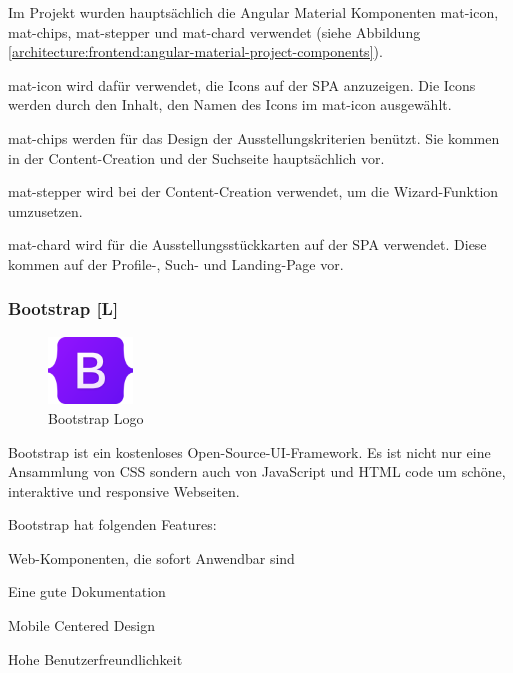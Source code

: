 Im Projekt wurden hauptsächlich die Angular Material Komponenten mat-icon, mat-chips, mat-stepper und mat-chard verwendet (siehe Abbildung \ref{architecture:frontend:angular-material-project-components}).

mat-icon wird dafür verwendet, die Icons auf der SPA anzuzeigen. Die Icons werden durch den Inhalt, den Namen des Icons im mat-icon ausgewählt.

mat-chips werden für das Design der Ausstellungskriterien benützt. Sie kommen in der Content-Creation und der Suchseite hauptsächlich vor.

mat-stepper wird bei der Content-Creation verwendet, um die Wizard-Funktion umzusetzen.

mat-chard wird für die Ausstellungsstückkarten auf der SPA verwendet. Diese kommen auf der Profile-, Such- und Landing-Page vor.

\subsubsection{Bootstrap [L]}
\begin{figure}
  \begin{center}
    \includegraphics[width=0.2\textwidth]{pics/Bootstrap_logo.png}
   \caption{Bootstrap Logo}
  \end{center}
\end{figure}
Bootstrap ist ein kostenloses Open-Source-UI-Framework. Es ist nicht nur eine Ansammlung von CSS sondern auch von JavaScript und HTML code um schöne, interaktive und responsive Webseiten.  \cite{BestCSSFrameworksin2022}

Bootstrap hat folgenden Features:  \cite{BestCSSFrameworksin2022}
\begin{compactitem}
    \item Web-Komponenten, die sofort Anwendbar sind
    \item Eine gute Dokumentation
    \item Mobile Centered Design
    \item Hohe Benutzerfreundlichkeit
\end{compactitem}

